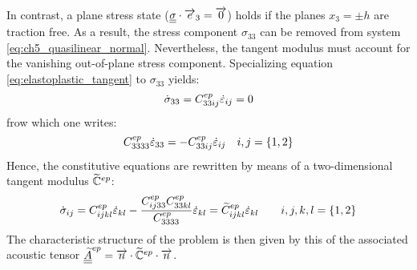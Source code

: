 In contrast, a plane stress state (${\underline{\underline{\sigma}}}\cdot{\overrightarrow{e}}_3={\overrightarrow{0}}$) holds if the planes $x_3=\pm h$ are traction free.
As a result, the stress component $\sigma_{33}$ can be removed from system \eqref{eq:ch5_quasilinear_normal}.
Nevertheless, the tangent modulus must account for the vanishing out-of-plane stress component.
Specializing equation \eqref{eq:elastoplastic_tangent} to $\sigma_{33}$ yields:
\begin{equation*}
  \dot{\sigma}_{33}=C^{ep}_{33ij} \dot{\varepsilon}_{ij} =0
\end{equation*}
frow which one writes:
\begin{equation*}
  C^{ep}_{3333} \dot{\varepsilon}_{33} = - C^{ep}_{33ij}\dot{\varepsilon}_{ij} \quad i,j=\{1,2\}
\end{equation*}
Hence, the constitutive equations are rewritten by means of a two-dimensional tangent modulus $\widetilde{\mathbb{C}}^{ep}$:
\begin{equation}
  \label{eq:CP_constitutive}
  \dot{\sigma}_{ij}=C^{ep}_{ijkl} \dot{\varepsilon}_{kl} - \frac{C^{ep}_{ij33}C^{ep}_{33kl}}{C^{ep}_{3333}}\dot{\varepsilon}_{kl}= \widetilde{C}^{ep}_{ijkl} \dot{\varepsilon}_{kl}\qquad i,j,k,l=\{1,2\} 
\end{equation}
The characteristic structure of the problem is then given by this of the associated acoustic tensor ${\underline{\underline{\widetilde{A}}}}^{ep}={\overrightarrow{n}}\cdot\widetilde{\mathbb{C}}^{ep}\cdot {\overrightarrow{n}}$.

